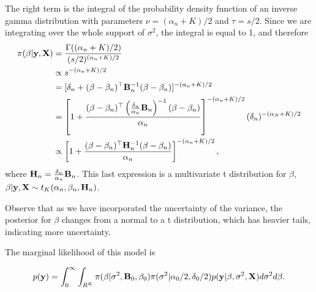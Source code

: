 The right term is the integral of the probability density function of an inverse gamma distribution with parameters $\nu = (\alpha_n+K)/2$ and $\tau = s/2$. Since we are integrating over the whole support of $\sigma^2$, the integral is equal to 1, and therefore
\begin{align*}
	\pi(\beta|{\bf{y}},{\bf{X}}) & = \frac{\Gamma((\alpha_n+K)/2)}{(s/2)^{(\alpha_n+K)/2}} \\
	& \propto s^{-(\alpha_n+K)/2} \\
	& = [\delta_n + (\beta - \beta_n)^{\top}{{\bf{B}}}_n^{-1}(\beta - \beta_n)]^{-(\alpha_n+K)/2} \\
	& = \left[1 + \frac{(\beta - \beta_n)^{\top}\left(\frac{\delta_n}{\alpha_n}{{\bf{B}}}_n\right)^{-1}(\beta - \beta_n)}{\alpha_n}\right]^{-(\alpha_n+K)/2}(\delta_n)^{-(\alpha_N+K)/2} \\
	& \propto \left[1 + \frac{(\beta - \beta_n)^{\top}{\bf{H}}_n^{-1}(\beta - \beta_n)}{\alpha_n}\right]^{-(\alpha_n+K)/2},
\end{align*}
where ${\bf{H}}_n = \frac{\delta_n}{\alpha_n}{\bf{B}}_n$. This last expression is a multivariate t distribution for $\beta$, $\beta|{\bf{y}},{\bf{X}} \sim t_K(\alpha_n, \beta_n, {\bf{H}}_n)$.

Observe that as we have incorporated the uncertainty of the variance, the posterior for $\beta$ changes from a normal to a t distribution, which has heavier tails, indicating more uncertainty. 

The marginal likelihood of this model is

\begin{align*}
	p({\bf{y}})=\int_0^{\infty}\int_{R^K}\pi (\beta | \sigma^2,{\bf{B}}_0,\beta_0 )\pi(\sigma^2| \alpha_0/2, \delta_0/2)p({\bf{y}}|\beta, \sigma^2, {\bf{X}})d\sigma^2 d\beta.
\end{align*}

